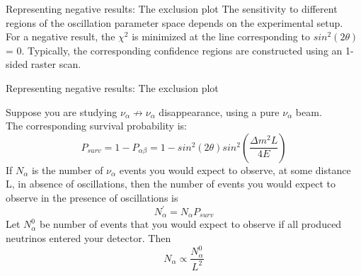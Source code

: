 \begin{frame}{Representing negative results: The exclusion plot}
\vspace{0.1cm}
The sensitivity to different regions of
the oscillation parameter space
depends on the experimental setup.\\
\vspace{0.3cm}
{\scriptsize
For a negative result, the $\chi^2$ is minimized at the
line corresponding to $sin^2(2\theta)$ = 0.
Typically, the corresponding confidence regions are
constructed using an 1-sided raster scan.\\
}

\end{frame}

%
%
%

\begin{frame}{Representing negative results: The exclusion plot}

Suppose you are studying $\nu_{\alpha} \not\to \nu_{\alpha}$ disappearance,
using a pure $\nu_{\alpha}$ beam.\\
The corresponding survival probability is:\\
\begin{equation*}
     P_{surv} = 1 - P_{\alpha \beta} = 1 - sin^{2} (2\theta) sin^2(\frac{\Delta m^{2}L}{4E})
\end{equation*}
If $N_{\alpha}$ is the number of $\nu_{\alpha}$ events you
would expect to observe, at some distance L, in absence of oscillations, then
the number of events you would expect to observe in the presence of oscillations is
\begin{equation*}
     N^{\prime}_{\alpha} = N_{\alpha} P_{surv}
\end{equation*}
Let $N^{0}_{\alpha}$ be number of events that you would expect to
observe if all produced neutrinos entered your detector. Then
\begin{equation*}
     N_{\alpha} \propto \frac{N^{0}_{\alpha}}{L^2}
\end{equation*}

\end{frame}

%
%
%

